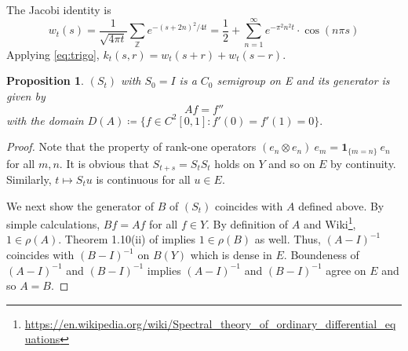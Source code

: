 \documentclass[12pt, reqno]{amsart}
\newcommand{\1}{\mathbbm 1}
\theoremstyle{plain}
\newtheorem{proposition}[theorem]{Proposition}
\theoremstyle{definition}
\begin{document}
The Jacobi identity is 
\begin{equation*}
	w_t(s)=\frac{1}{\sqrt{4\pi t}}\sum_{\mathbb{Z}}e^{-(s+2n)^2/4t}=\frac{1}{2}+\sum_{n=1}^{\infty} e^{-\pi^2n^2 t} \cdot \cos(n\pi s)
\end{equation*}
Applying \eqref{eq:trigo}, $k_t(s,r)=w_t(s+r)+w_t(s-r)$. 
\begin{proposition}
	$(S_t)$ with $S_0=I$ is a $C_0$ semigroup on E and its generator is given by
	\begin{equation*}
		Af=f''
	\end{equation*}
   with the domain $D(A)\coloneq\{f\in C^2[0,1]:f'(0)=f'(1)=0\}.$
\end{proposition}
\begin{proof}
	Note that the property of rank-one operators $(e_n\otimes e_n)\ e_m=\mathbf{1}_{\{m=n\}}\ e_n$ for all $m,n$. It is obvious that $S_{t+s}=S_tS_t$ holds on $Y$ and so on $E$ by continuity. Similarly, $t\mapsto S_t u$ is continuous for all $u\in E.$ 
	
	We next show the generator of $B$ of $(S_t)$ coincides with $A$ defined above. By simple calculations, $Bf=Af$ for all $f\in Y.$ By definition of $A$ and Wiki\footnote{\url{https://en.wikipedia.org/wiki/Spectral_theory_of_ordinary_differential_equations}}, $1\in \rho(A)$. Theorem 1.10(ii) of \cite{engel2006short} implies $1\in \rho(B)$ as well. Thus, $(A-I)^{-1}$ coincides with $(B-I)^{-1}$ on $B(Y)$ which is dense in $E.$ Boundeness of $(A-I)^{-1}$ and $(B-I)^{-1}$ implies $(A-I)^{-1}$ and $(B-I)^{-1}$ agree on $E$ and so $A=B.$
\end{proof}
\newpage


\end{document}
